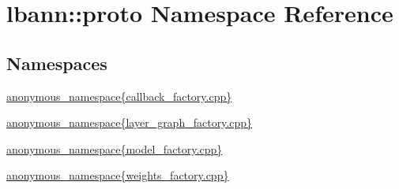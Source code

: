 \hypertarget{namespacelbann_1_1proto}{}\section{lbann\+:\+:proto Namespace Reference}
\label{namespacelbann_1_1proto}
\subsection*{Namespaces}
\begin{DoxyCompactItemize}
\item 
 \hyperlink{namespacelbann_1_1proto_1_1anonymous__namespace_02callback__factory_8cpp_03}{anonymous\+\_\+namespace\{callback\+\_\+factory.\+cpp\}}
\item 
 \hyperlink{namespacelbann_1_1proto_1_1anonymous__namespace_02layer__graph__factory_8cpp_03}{anonymous\+\_\+namespace\{layer\+\_\+graph\+\_\+factory.\+cpp\}}
\item 
 \hyperlink{namespacelbann_1_1proto_1_1anonymous__namespace_02model__factory_8cpp_03}{anonymous\+\_\+namespace\{model\+\_\+factory.\+cpp\}}
\item 
 \hyperlink{namespacelbann_1_1proto_1_1anonymous__namespace_02weights__factory_8cpp_03}{anonymous\+\_\+namespace\{weights\+\_\+factory.\+cpp\}}
\end{DoxyCompactItemize}
